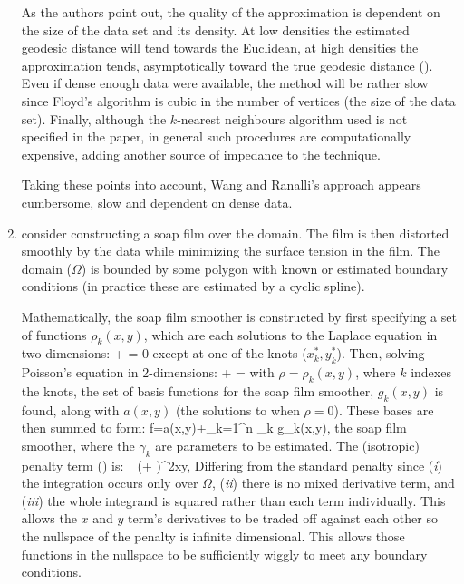 \begin{enumerate}
As the authors point out, the quality of the approximation is dependent on the size of the data set and its density. At low densities the estimated geodesic distance will tend towards the Euclidean, at high densities the approximation tends, asymptotically toward the true geodesic distance (\cite{bernstein}). Even if  dense enough data were available, the method will be rather slow since Floyd's algorithm is cubic in the number of vertices (the size of the data set). Finally, although the $k$-nearest neighbours algorithm used is not specified in the paper, in general such procedures are computationally expensive, adding another source of impedance to the technique.

Taking these points into account, Wang and Ranalli's approach appears cumbersome, slow and dependent on dense data.

\item \cite{soap} consider constructing a soap film over the domain. The film is then distorted smoothly by the data while minimizing the surface tension in the film. The domain ($\Omega$) is bounded by some polygon with known or estimated boundary conditions (in practice these are estimated by a cyclic spline).

Mathematically, the soap film smoother is constructed by first specifying a set of functions $\rho_k(x,y)$, which are each solutions to the Laplace equation in two dimensions:
\be
{} +  = 0
\ee
except at one of the knots ($x^*_k,y^*_k$). Then, solving Poisson's equation in 2-dimensions:
\be
{} +  = \rho
\label{soap-poisson}
\ee
with $\rho=\rho_k(x,y)$, where $k$ indexes the knots, the set of basis functions for the soap film smoother, $g_k(x,y)$ is found, along with $a(x,y)$ (the solutions to  when $\rho=0$). These bases are then summed to form:
\be
f=a(x,y)+\sum_{k=1}^n \gamma_k g_k(x,y),
\ee
the soap film smoother, where the $\gamma_k$ are parameters to be estimated. The (isotropic) penalty term () is:
\be
\int_\Omega \Big(+ \Big)^2xy,
\ee
Differing from the standard \tprs penalty since (\emph{i}) the integration occurs only over $\Omega$, (\emph{ii}) there is no mixed derivative term, and (\emph{iii}) the whole integrand is squared rather than each term individually. This allows the $x$ and $y$ term's derivatives to be traded off against each other so the nullspace of the penalty is infinite dimensional. This allows those functions in the nullspace to be sufficiently wiggly to meet any boundary conditions.


\end{enumerate}
